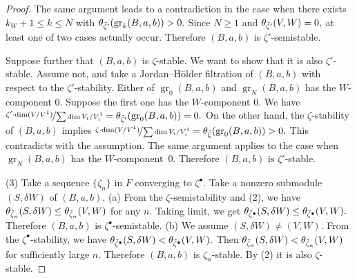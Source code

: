 \documentclass[10pt,a4paper]{amsart}
\theoremstyle{definition}
\numberwithin{equation}{section}
\newcommand{\gr}{\operatorname{gr}} %
\begin{document}
\begin{proof}
The same argument leads to a contradiction in the case when
there exists $k_W+1 \le k \le N$ with
\(
   \theta_{\Tilde\zeta'}(\gr_k(B,a,b)) > 0.
\)
Since $N\ge 1$ and
\(
   \theta_{\Tilde\zeta'}(V,W) = 0,
\)
at least one of two cases actually occur. Therefore $(B,a,b)$ is
$\zeta'$-semistable.

Suppose further that $(B,a,b)$ is $\zeta$-stable. We want to show that
it is also $\zeta'$-stable. Assume not, and take a Jordan--H\"older
f\/iltration of $(B,a,b)$ with respect to the $\zeta'$-stability. Either
of $\gr_0(B,a,b)$ and $\gr_N(B,a,b)$ has the $W$-component $0$. Suppose
the f\/irst one has the $W$-component $0$. We have
\(
   \nicefrac{\zeta'\cdot \dim (V/V^1)}{\sum \dim V_i/V^1_i} =
   \theta_{\Tilde\zeta'}(\gr_0(B,a,b)) = 0.
\)
On the other hand, the $\zeta$-stability of $(B,a,b)$ implies
\(
   \nicefrac{\zeta\cdot \dim (V/V^1)}{\sum \dim V_i/V^1_i} =
   \theta_{\Tilde\zeta}(\gr_0(B,a,b)) > 0.
\)
This contradicts with the assumption. The same argument applies
to the case when $\gr_N(B,a,b)$ has the $W$-component~$0$. Therefore
$(B,a,b)$ is $\zeta'$-stable.

(3) Take a sequence $\{ \zeta_n \}$ in $F$ converging to $\zeta^\bullet$.
Take a nonzero submodule $(S,\delta W)$ of $(B,a,b)$.
%
(a) From the $\zeta$-semistability and (2), we have
\(
   \theta_{\Tilde\zeta_n}(S,\delta W) \le
   \theta_{\Tilde\zeta_n}(V, W)
\)
for any $n$. Taking limit, we get
\(
   \theta_{\Tilde\zeta^\bullet}(S,\delta W) \le
   \theta_{\Tilde\zeta^\bullet}(V,W).
\)
Therefore $(B,a,b)$ is $\zeta^\bullet$-semistable.
%
(b) We assume $(S,\delta W) \neq (V,W)$.
From the $\zeta^\bullet$-stability, we have
\(
   \theta_{\Tilde\zeta^\bullet}(S,\delta W) <
   \theta_{\Tilde\zeta^\bullet}(V,W).
\)
Then
\(
   \theta_{\Tilde\zeta_n}(S,\delta W) <
   \theta_{\Tilde\zeta_n}(V,W)
\)
for suf\/f\/iciently large $n$. Therefore $(B,a,b)$ is
$\zeta_n$-stable. By (2) it is also $\zeta$-stable.
\end{proof}
\end{document}
